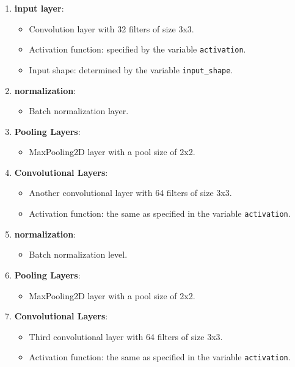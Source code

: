 \documentclass{article}
\begin{document}
\begin{enumerate}
    \item \textbf{input layer}:
          \begin{itemize}
              \item Convolution layer with 32 filters of size 3x3.
              \item Activation function: specified by the variable \texttt{activation}.
              \item Input shape: determined by the variable \texttt{input\_shape}.
          \end{itemize}

    \item \textbf{normalization}:
          \begin{itemize}
              \item Batch normalization layer.
          \end{itemize}

    \item \textbf{Pooling Layers}:
          \begin{itemize}
              \item MaxPooling2D layer with a pool size of 2x2.
          \end{itemize}

    \item \textbf{Convolutional Layers}:
          \begin{itemize}
              \item Another convolutional layer with 64 filters of size 3x3.
              \item Activation function: the same as specified in the variable \texttt{activation}.
          \end{itemize}

    \item \textbf{normalization}:
          \begin{itemize}
              \item Batch normalization level.
          \end{itemize}

    \item \textbf{Pooling Layers}:
          \begin{itemize}
              \item MaxPooling2D layer with a pool size of 2x2.
          \end{itemize}

    \item \textbf{Convolutional Layers}:
          \begin{itemize}
              \item Third convolutional layer with 64 filters of size 3x3.
              \item Activation function: the same as specified in the variable \texttt{activation}.
          \end{itemize}


\end{enumerate}
\end{document}
